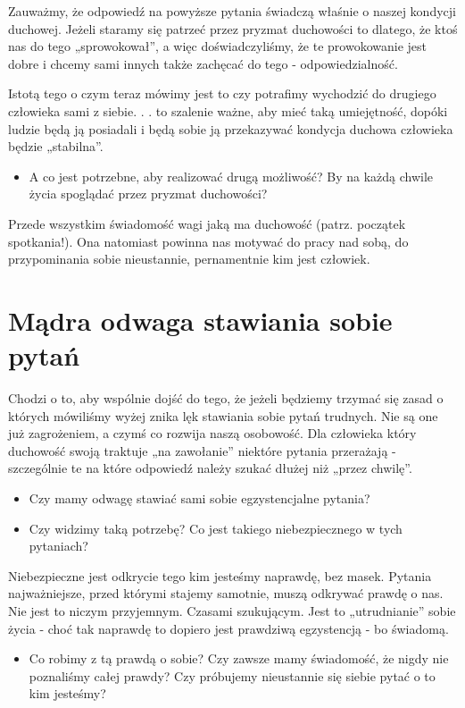 \documentclass[a5paper,10pt,polish]{book}
\begin{document}
Zauważmy,  że odpowiedź na powyższe pytania świadczą właśnie o naszej kondycji duchowej. Jeżeli staramy się patrzeć przez pryzmat duchowości to dlatego, że ktoś nas do tego „sprowokował”, a więc doświadczyliśmy, że te prowokowanie jest dobre i chcemy sami  innych także  zachęcać do tego - odpowiedzialność.

Istotą  tego o czym teraz mówimy jest  to czy potrafimy wychodzić do drugiego człowieka sami z siebie. . . to szalenie ważne, aby mieć taką umiejętność, dopóki ludzie będą ją posiadali i będą sobie ją przekazywać kondycja duchowa człowieka będzie „stabilna”.
\begin{itemize}
\item {} 
A  co jest potrzebne,  aby realizować drugą możliwość? By na każdą chwile życia spoglądać przez pryzmat duchowości?

\end{itemize}

Przede wszystkim świadomość wagi jaką ma duchowość (patrz. początek spotkania!). Ona natomiast powinna nas motywać do pracy nad sobą, do przypominania sobie nieustannie, pernamentnie kim jest człowiek.


\section{Mądra odwaga stawiania sobie pytań}
\label{babice2006-wiosna-knurow/spotkanie1:madra-odwaga-stawiania-sobie-pytan}
Chodzi o to, aby wspólnie dojść do tego, że jeżeli będziemy trzymać się zasad o których mówiliśmy wyżej znika lęk stawiania sobie pytań trudnych. Nie są one już zagrożeniem, a czymś co rozwija naszą osobowość. Dla człowieka który duchowość swoją traktuje „na zawołanie” niektóre pytania przerażają - szczególnie te na które odpowiedź należy szukać dłużej niż „przez chwilę”.
\begin{itemize}
\item {} 
Czy mamy odwagę stawiać  sami sobie egzystencjalne  pytania?

\item {} 
Czy widzimy taką potrzebę? Co jest takiego niebezpiecznego w tych pytaniach?

\end{itemize}

Niebezpieczne jest  odkrycie tego kim jesteśmy  naprawdę,  bez  masek. Pytania najważniejsze, przed którymi  stajemy samotnie,  muszą odkrywać prawdę o nas. Nie jest to niczym przyjemnym. Czasami szukującym.  Jest to „utrudnianie” sobie życia - choć tak naprawdę to dopiero jest prawdziwą egzystencją - bo świadomą.
\begin{itemize}
\item {} 
Co robimy z tą prawdą o sobie? Czy zawsze mamy świadomość, że nigdy nie poznaliśmy całej prawdy? Czy próbujemy nieustannie się siebie pytać o to kim jesteśmy?

\end{itemize}
\end{document}
